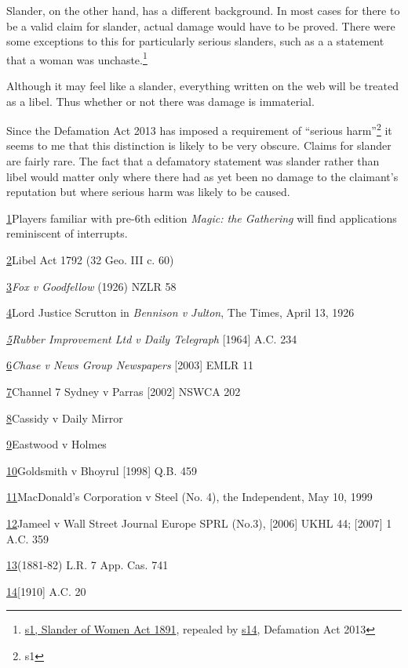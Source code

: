 \documentclass[]{article}
\begin{document}
Slander, on the other hand, has a different background. In most cases
for there to be a valid claim for slander, actual damage would have to
be proved. There were some exceptions to this for particularly serious
slanders, such as a a statement that a woman was unchaste.\footnote{\href{http://www.legislation.gov.uk/ukpga/Vict/54-55/51/section/1}{s1, Slander of Women Act 1891}, repealed by \href{http://www.legislation.gov.uk/ukpga/2013/26/section/14/enacted}{s14}, Defamation Act 2013}

Although it may feel like a slander, everything written on the web will
be treated as a libel. Thus whether or not there was damage is
immaterial.

Since the Defamation Act 2013 has imposed a requirement of ``serious harm''\footnote{s1} it seems to me that this distinction is likely to be very obscure. Claims for slander are fairly rare. The fact that a defamatory statement was slander rather than libel would matter only where there had as yet been no damage to the claimant's reputation but where serious harm was likely to be caused.


\hyperref[sdfootnote1anc]{1}Players familiar with pre-6th edition
\emph{Magic: the Gathering} will find applications reminiscent of
interrupts.

\hyperref[sdfootnote2anc]{2}Libel Act 1792 (32 Geo. III c. 60)

\hyperref[sdfootnote3anc]{3}\emph{Fox v Goodfellow} (1926) NZLR 58

\hyperref[sdfootnote4anc]{4}Lord Justice Scrutton in \emph{Bennison v
Julton}{, The Times, April 13, 1926}

\emph{\hyperref[sdfootnote5anc]{5}Rubber Improvement Ltd v Daily
Telegraph}{ {[}1964{]} A.C. 234}

\hyperref[sdfootnote6anc]{6}\emph{Chase v News Group Newspapers}
{[}2003{]} EMLR 11

\hyperref[sdfootnote7anc]{7}Channel 7 Sydney v Parras {[}2002{]} NSWCA
202

\hyperref[sdfootnote8anc]{8}Cassidy v Daily Mirror

\hyperref[sdfootnote9anc]{9}Eastwood v Holmes

\hyperref[sdfootnote10anc]{10}Goldsmith v Bhoyrul {[}1998{]} Q.B. 459

\hyperref[sdfootnote11anc]{11}MacDonald's Corporation v Steel (No. 4),
the Independent, May 10, 1999

\hyperref[sdfootnote12anc]{12}Jameel v Wall Street Journal Europe SPRL
(No.3), {[}2006{]} UKHL 44; {[}2007{]} 1 A.C. 359

\hyperref[sdfootnote13anc]{13}(1881-82) L.R. 7 App. Cas. 741

\hyperref[sdfootnote14anc]{14}{[}1910{]} A.C. 20
\end{document}
